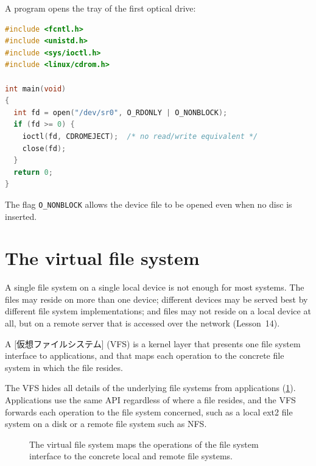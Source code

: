 \documentclass[../main.tex]{subfiles}
\begin{document}
\begin{example}
  A program opens the tray of the first optical drive:
  \begin{lstlisting}[language=C, numbers=none]
#include <fcntl.h>
#include <unistd.h>
#include <sys/ioctl.h>
#include <linux/cdrom.h>

int main(void)
{
  int fd = open("/dev/sr0", O_RDONLY | O_NONBLOCK);
  if (fd >= 0) {
    ioctl(fd, CDROMEJECT);  /* no read/write equivalent */
    close(fd);
  }
  return 0;
}
\end{lstlisting}
  The flag \texttt{O\_NONBLOCK} allows the device file to be opened even
  when no disc is inserted.
\end{example}

\section{The virtual file system}
\label{sec:l11-vfs}

A single file system on a single local device is not enough for most
systems.  The files may reside on more than one device; different devices
may be served best by different file system implementations; and files may
not reside on a local device at all, but on a remote server that is accessed
over the network (Lesson~14).

\begin{definition}
  A [仮想ファイルシステム]%
   (VFS) is a kernel layer that presents
  one file system interface to applications, and that maps each operation to
  the concrete file system in which the file resides.
\end{definition}

The VFS hides all details of the underlying file systems from applications
(\cref{fig:l11-vfs}).  Applications use the same API regardless of where a
file resides, and the VFS forwards each operation to the file system
concerned, such as a local ext2 file system on a disk or a remote file
system such as NFS.

\begin{figure}[tb]
  \centering
  
  \caption{The virtual file system maps the operations of the file system
    interface to the concrete local and remote file systems.}
  \label{fig:l11-vfs}
\end{figure}
\end{document}
